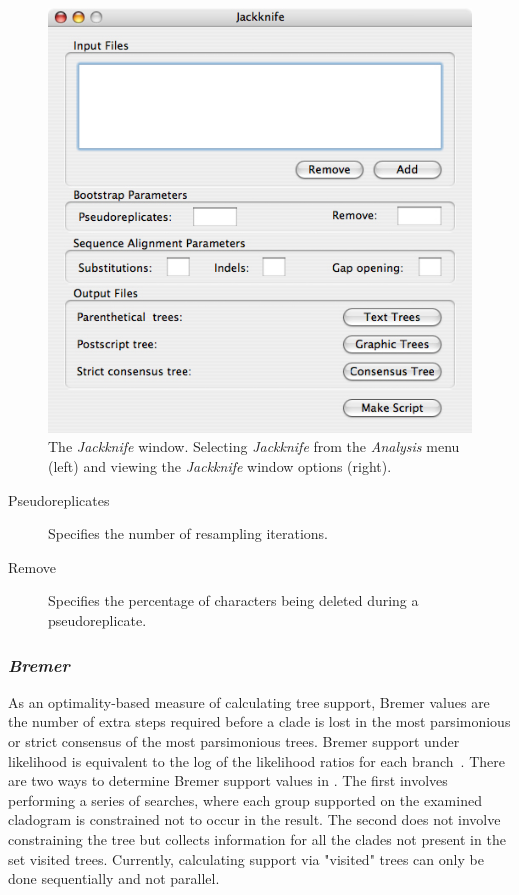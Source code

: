 {\begin{figure}
\begin{minipage}[c]{0.52\textwidth}
	   	\includegraphics[width=\textwidth]{doc/figures/jackknife_window.jpg}
   	\end{minipage}
\caption{The \emph{Jackknife} window. Selecting \emph{Jackknife} from the \emph{Analysis} menu (left) and 
viewing the \emph{Jackknife} window options (right).}
\label{fig:jackknife}
\end{figure}

\begin{description}
    \item[Pseudoreplicates] Specifies the number of resampling iterations.
    \item[Remove] Specifies the percentage of characters being deleted during a pseudoreplicate.
\end{description}

\subsubsection*{\emph{Bremer}}

As an optimality-based measure of calculating tree support, Bremer values are the number of extra steps required before a clade is lost 
in the most parsimonious or strict consensus of the most parsimonious trees.  Bremer support under likelihood is equivalent 
to the log of the likelihood ratios for each branch~\cite{Wheeler2006}.  There are two ways to determine Bremer support values in \poy.  
The first involves performing a series of searches, where each group supported on the examined cladogram is constrained not to occur in 
the result.  The second does not involve constraining the tree but collects information for all the clades not present in the set visited trees.
Currently, calculating support via "visited" trees can only be done sequentially and not parallel.

}
